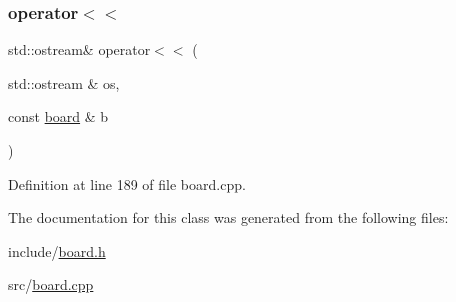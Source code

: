 \subsubsection{\texorpdfstring{operator$<$$<$}{operator<<}}
{\footnotesize\ttfamily std\+::ostream\& operator$<$$<$ (\begin{DoxyParamCaption}\item[{std\+::ostream \&}]{os,  }\item[{const \hyperlink{classbattle__ship_1_1board}{board} \&}]{b }\end{DoxyParamCaption})\hspace{0.3cm}{\ttfamily [friend]}}



Definition at line 189 of file board.\+cpp.



The documentation for this class was generated from the following files\+:\begin{DoxyCompactItemize}
\item 
include/\hyperlink{board_8h}{board.\+h}\item 
src/\hyperlink{board_8cpp}{board.\+cpp}\end{DoxyCompactItemize}
